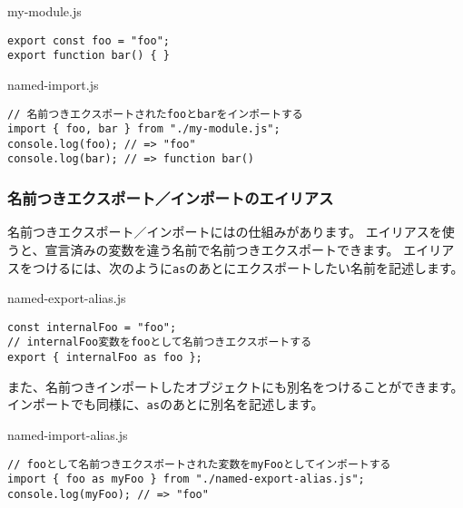 \begin{listtitle}
my-module.js
\end{listtitle}
\begin{lstlisting}
export const foo = "foo";
export function bar() { }
\end{lstlisting}
\listend

\begin{listtitle}
named-import.js
\end{listtitle}
\begin{lstlisting}
// 名前つきエクスポートされたfooとbarをインポートする
import { foo, bar } from "./my-module.js";
console.log(foo); // => "foo"
console.log(bar); // => function bar()
\end{lstlisting}
\listend

\hypertarget{named-export-import-alias}{%
\subsubsection{名前つきエクスポート／インポートのエイリアス}\label{named-export-import-alias}}

名前つきエクスポート／インポートには\textbf{}の仕組みがあります。
エイリアスを使うと、宣言済みの変数を違う名前で名前つきエクスポートできます。
エイリアスをつけるには、次のように\texttt{as}のあとにエクスポートしたい名前を記述します。

\begin{listtitle}
named-export-alias.js
\end{listtitle}
\begin{lstlisting}
const internalFoo = "foo";
// internalFoo変数をfooとして名前つきエクスポートする
export { internalFoo as foo };
\end{lstlisting}
\listend

また、名前つきインポートしたオブジェクトにも別名をつけることができます。
インポートでも同様に、\texttt{as}のあとに別名を記述します。

\begin{listtitle}
named-import-alias.js
\end{listtitle}
\begin{lstlisting}
// fooとして名前つきエクスポートされた変数をmyFooとしてインポートする
import { foo as myFoo } from "./named-export-alias.js";
console.log(myFoo); // => "foo"
\end{lstlisting}
\listend

